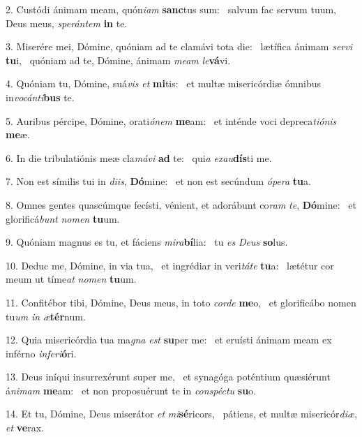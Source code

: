 2. Custódi ánimam meam, quón\textit{i}\textit{am} \textbf{sanc}tus sum: \ast\  salvum fac servum tuum, Deus meus, \textit{spe}\textit{rán}\textit{tem} \textbf{in} te.\

3. Miserére mei, Dómine, quóniam ad te clamávi tota die: \dag\  lætífica ánimam \textit{ser}\textit{vi} \textbf{tu}i, \ast\  quóniam ad te, Dómine, ánimam \textit{me}\textit{am} \textit{le}\textbf{vá}vi.\

4. Quóniam tu, Dómine, suá\textit{vis} \textit{et} \textbf{mi}tis: \ast\  et multæ misericórdiæ ómnibus in\textit{vo}\textit{cán}\textit{ti}\textbf{bus} te.\

5. Auribus pércipe, Dómine, orati\textit{ó}\textit{nem} \textbf{me}am: \ast\  et inténde voci depreca\textit{ti}\textit{ó}\textit{nis} \textbf{me}æ.\

6. In die tribulatiónis meæ cla\textit{má}\textit{vi} \textbf{ad} te: \ast\  qui\textit{a} \textit{ex}\textit{au}\textbf{dís}ti me.\

7. Non est símilis tui in \textit{di}\textit{is}, \textbf{Dó}mine: \ast\  et non est secúndum \textit{ó}\textit{pe}\textit{ra} \textbf{tu}a.\

8. Omnes gentes quascúmque fecísti, vénient, et adorábunt co\textit{ram} \textit{te}, \textbf{Dó}mine: \ast\  et glorificá\textit{bunt} \textit{no}\textit{men} \textbf{tu}um.\

9. Quóniam magnus es tu, et fáciens \textit{mi}\textit{ra}\textbf{bí}lia: \ast\  tu \textit{es} \textit{De}\textit{us} \textbf{so}lus.\

10. Deduc me, Dómine, in via tua, \dag\  et ingrédiar in veri\textit{tá}\textit{te} \textbf{tu}a: \ast\  lætétur cor meum ut tíme\textit{at} \textit{no}\textit{men} \textbf{tu}um.\

11. Confitébor tibi, Dómine, Deus meus, in toto \textit{cor}\textit{de} \textbf{me}o, \ast\  et glorificábo nomen tu\textit{um} \textit{in} \textit{æ}\textbf{tér}num.\

12. Quia misericórdia tua ma\textit{gna} \textit{est} \textbf{su}per me: \ast\  et eruísti ánimam meam ex inférno \textit{in}\textit{fe}\textit{ri}\textbf{ó}ri.\

13. Deus iníqui insurrexérunt super me, \dag\  et synagóga poténtium quæsiérunt á\textit{ni}\textit{mam} \textbf{me}am: \ast\  et non proposuérunt te in \textit{con}\textit{spéc}\textit{tu} \textbf{su}o.\

14. Et tu, Dómine, Deus miserátor \textit{et} \textit{mi}\textbf{sé}ricors, \ast\  pátiens, et multæ misericór\textit{di}\textit{æ}, \textit{et} \textbf{ve}rax.\

